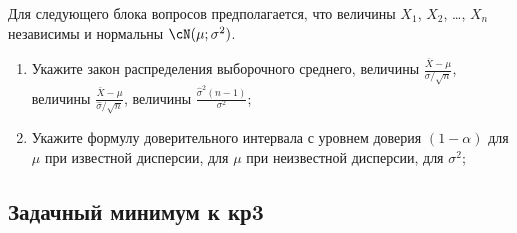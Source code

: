 Для следующего блока вопросов предполагается, что величины $X_1$, $X_2$, \ldots, $X_n$ независимы и нормальны $\cN(\mu;\sigma^2)$.

\begin{enumerate}[resume]
  \item Укажите закон распределения выборочного среднего, величины $\frac{\bar X - \mu}{\sigma/\sqrt{n}}$, величины $\frac{\bar X - \mu}{\hat\sigma/\sqrt{n}}$, величины $\frac{\hat\sigma^2(n-1)}{\sigma^2}$;
  \item Укажите формулу доверительного интервала с уровнем доверия $(1-\alpha)$ для $\mu$ при известной дисперсии, для $\mu$ при неизвестной дисперсии, для $\sigma^2$;
\end{enumerate}

\subsection{Задачный минимум к кр3}

